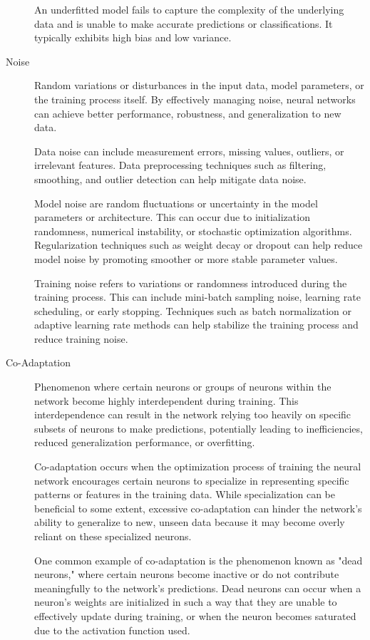 \documentclass[a4paper]{report}
\begin{document}
\begin{description}
An underfitted model fails to capture the complexity of the underlying data and is unable to make accurate predictions or classifications. It typically exhibits high bias and low variance.

\item[Noise]
Random variations or disturbances in the input data, model parameters, or the training process itself. By effectively managing noise, neural networks can achieve better performance, robustness, and generalization to new data.

Data noise can include measurement errors, missing values, outliers, or irrelevant features. Data preprocessing techniques such as filtering, smoothing, and outlier detection can help mitigate data noise. 

Model noise are random fluctuations or uncertainty in the model parameters or architecture. This can occur due to initialization randomness, numerical instability, or stochastic optimization algorithms. Regularization techniques such as weight decay or dropout can help reduce model noise by promoting smoother or more stable parameter values.

Training noise refers to variations or randomness introduced during the training process. This can include mini-batch sampling noise, learning rate scheduling, or early stopping. Techniques such as batch normalization or adaptive learning rate methods can help stabilize the training process and reduce training noise.

\item[Co-Adaptation]
Phenomenon where certain neurons or groups of neurons within the network become highly interdependent during training. This interdependence can result in the network relying too heavily on specific subsets of neurons to make predictions, potentially leading to inefficiencies, reduced generalization performance, or overfitting.

Co-adaptation occurs when the optimization process of training the neural network encourages certain neurons to specialize in representing specific patterns or features in the training data. While specialization can be beneficial to some extent, excessive co-adaptation can hinder the network's ability to generalize to new, unseen data because it may become overly reliant on these specialized neurons.

One common example of co-adaptation is the phenomenon known as "dead neurons," where certain neurons become inactive or do not contribute meaningfully to the network's predictions. Dead neurons can occur when a neuron's weights are initialized in such a way that they are unable to effectively update during training, or when the neuron becomes saturated due to the activation function used.


\end{description}
\end{document}
